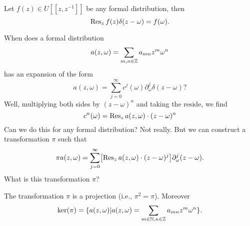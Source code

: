 \label{prop:integrateDeltaFn}
Let $f(z)\in U[[z,z^{-1}]]$ be any formal distribution, then
\begin{equation}
\Res[z]{f(z)\delta(z-\omega)}=f(\omega).
\end{equation}


\M
When does a formal distribution
\begin{equation}
a(z,\omega)=\sum_{m,n\in\ZZ}a_{mn}z^{m}\omega^{n}
\end{equation}
has an expansion of the form
\begin{equation}
a(z,\omega)=\sum^{\infty}_{j=0}c^{j}(\omega)\partial^{j}_{\omega}\delta(z-\omega)?
\end{equation}
Well, multiplying both sides by $(z-\omega)^{n}$ and taking the reside,
we find
\begin{equation}
c^{n}(\omega)=\Res[z]{a(z,\omega)\cdot(z-\omega)^{n}}
\end{equation}
Can we do this for any formal distribution? Not really. But we can
construct a transformation $\pi$ such that
\begin{equation}
\pi
a(z,\omega)=\sum^{\infty}_{j=0}\bigl[\Res[z]{a(z,\omega)\cdot(z-\omega)^{j}}\bigr]\partial^{j}_{\omega}(z-\omega).
\end{equation}
What is this transformation $\pi$?

\begin{prop}
The transformation $\pi$ is a projection (i.e., $\pi^{2}=\pi$). Moreover
\begin{equation}
\ker(\pi)=\{a(z,\omega)| a(z,\omega)=\sum_{m\in\NN,n\in\ZZ}a_{mn}z^{m}\omega^{n}\}.
\end{equation}
\end{prop}

